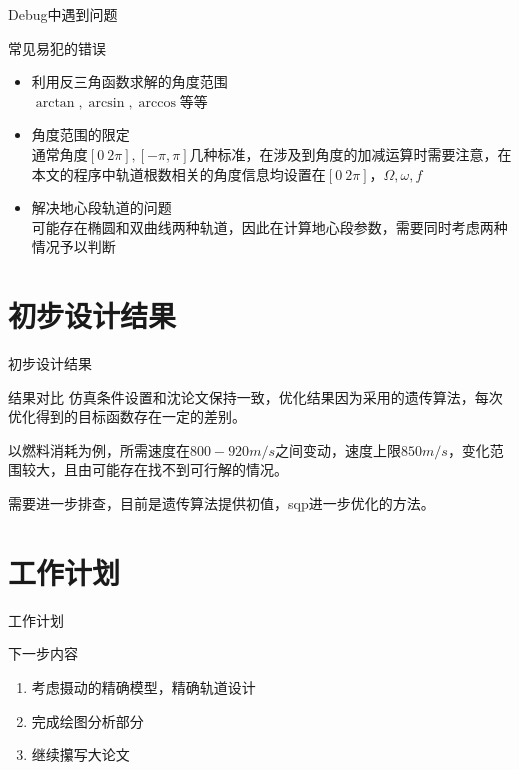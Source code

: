 \documentclass[11pt]{ctexbeamer}
\begin{document}
\begin{frame}{Debug中遇到问题}
	\begin{block}{常见易犯的错误}
		\begin{itemize}
			\item 利用反三角函数求解的角度范围\\
			$ \arctan,\arcsin,\arccos $等等
			\item 角度范围的限定\\
			通常角度$[0~2\pi],[-\pi,\pi]$几种标准，在涉及到角度的加减运算时需要注意，在本文的程序中轨道根数相关的角度信息均设置在$[0~2\pi]$，$ \Omega,\omega,f $
			\item 解决地心段轨道的问题\\
			可能存在椭圆和双曲线两种轨道，因此在计算地心段参数，需要同时考虑两种情况予以判断
		\end{itemize}
	\end{block}
\end{frame}
\section{初步设计结果}
\begin{frame}{初步设计结果}
	\begin{block}{结果对比}
		仿真条件设置和沈论文保持一致，优化结果因为采用的遗传算法，每次优化得到的目标函数存在一定的差别。
		
		以燃料消耗为例，所需速度在$800-920m/s$之间变动，速度上限$850m/s$，变化范围较大，且由可能存在找不到可行解的情况。
		
		需要进一步排查，目前是遗传算法提供初值，sqp进一步优化的方法。		
	\end{block}
	
\end{frame}
\section{工作计划}
\begin{frame}{工作计划}
	\begin{block}{下一步内容}
		\begin{enumerate}
			\item 考虑摄动的精确模型，精确轨道设计
			\item 完成绘图分析部分
			\item 继续攥写大论文
		\end{enumerate}
	\end{block}
\end{frame}
\end{document}
